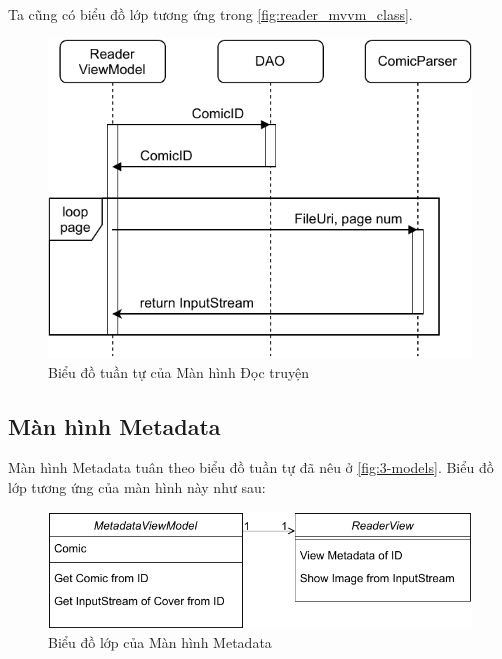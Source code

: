 \documentclass[../../../../thesis]{subfiles}
\begin{document}
Ta cũng có biểu đồ lớp tương ứng trong \autoref{fig:reader_mvvm_class}.

\begin{figure}[H]
    \centering
    \includegraphics[scale=0.85]{../images/reader_sequence.pdf}
    \caption{Biểu đồ tuần tự của Màn hình Đọc truyện}
    \label{fig:reader-sequence}
\end{figure}



\subsection{Màn hình Metadata}\label{sec:metadata-design}

Màn hình Metadata tuân theo biểu đồ tuần tự đã nêu ở \autoref{fig:3-models}.
Biểu đồ lớp tương ứng của màn hình này như sau:

\begin{figure}[H]
    \centering
    \includegraphics[scale=0.85]{../images/metadata_mvvm_class.pdf}
    \caption{Biểu đồ lớp của Màn hình Metadata}
    \label{fig:metadata_mvvm_class}
\end{figure}
\end{document}
